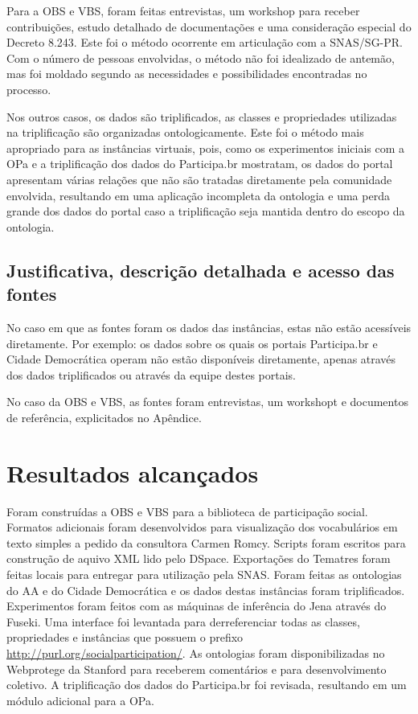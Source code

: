 \documentclass[12pt]{article}
\begin{document}
Para a OBS e VBS, foram feitas entrevistas, um workshop para receber contribuições, estudo detalhado de documentações e uma consideração especial do Decreto 8.243. Este foi o método ocorrente em articulação com a SNAS/SG-PR. Com o número de pessoas envolvidas, o método não foi idealizado de antemão, mas foi moldado segundo as necessidades e possibilidades encontradas no processo.

Nos outros casos, os dados são triplificados, as classes e propriedades utilizadas na triplificação são organizadas ontologicamente. Este foi o método mais apropriado para as instâncias virtuais, pois, como os experimentos iniciais com a OPa e a triplificação dos dados do Participa.br mostratam, os dados do portal apresentam várias relações que não são tratadas diretamente pela comunidade envolvida, resultando em uma aplicação incompleta da ontologia e uma perda grande dos dados do portal caso a triplificação seja mantida dentro do escopo da ontologia.

\subsection{Justificativa, descrição detalhada e acesso das fontes}
No caso em que as fontes foram os dados das instâncias, estas não estão acessíveis diretamente. Por exemplo: os dados sobre os quais os portais Participa.br e Cidade Democrática operam não estão disponíveis diretamente, apenas através dos dados triplificados ou através da equipe destes portais.

No caso da OBS e VBS, as fontes foram entrevistas, um workshopt e documentos de referência, explicitados no Apêndice.

\section{Resultados alcançados}
Foram construídas a OBS e VBS para a biblioteca de participação social. Formatos adicionais foram desenvolvidos para visualização dos vocabulários em texto simples a pedido da consultora Carmen Romcy. Scripts foram escritos para construção de aquivo XML lido pelo DSpace. Exportações do Tematres foram feitas locais para entregar para utilização pela SNAS. Foram feitas as ontologias do AA e do Cidade Democrática e os dados destas instâncias foram triplificados. Experimentos foram feitos com as máquinas de inferência do Jena através do Fuseki. Uma interface foi levantada para derreferenciar todas as classes, propriedades e instâncias que possuem o prefixo \url{http://purl.org/socialparticipation/}. As ontologias foram disponibilizadas no Webprotege da Stanford para receberem comentários e para desenvolvimento coletivo. A triplificação dos dados do Participa.br foi revisada, resultando em um módulo adicional para a OPa. 
\end{document}
